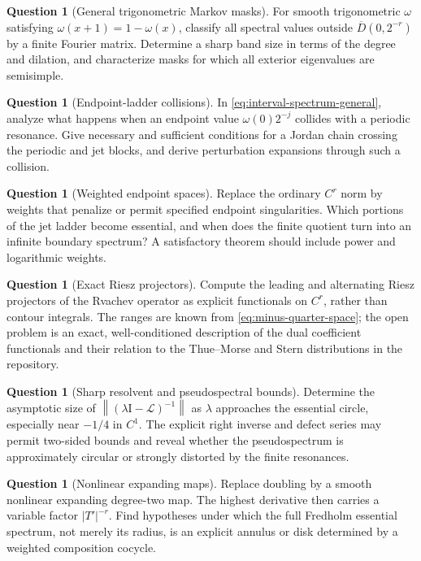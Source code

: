 \documentclass[11pt,a4paper]{article}
\theoremstyle{definition}
\newtheorem{question}[theorem]{Question}
\theoremstyle{remark}
\newcommand{\Dbar}[1]{\overline{D}(0,#1)}
\newcommand{\norm}[1]{\left\lVert #1\right\rVert}
\newcommand{\Lop}{\mathcal L}
\newcommand{\id}{\mathrm I}
\begin{document}
\begin{question}[General trigonometric Markov masks]
For smooth trigonometric $\omega$ satisfying
$\omega(x+1)=1-\omega(x)$, classify all spectral values outside
$\Dbar{2^{-r}}$ by a finite Fourier matrix.  Determine a sharp band size in
terms of the degree and dilation, and characterize masks for which all
exterior eigenvalues are semisimple.
\end{question}

\begin{question}[Endpoint-ladder collisions]
In \eqref{eq:interval-spectrum-general}, analyze what happens when an endpoint
value $\omega(0)2^{-j}$ collides with a periodic resonance.  Give necessary
and sufficient conditions for a Jordan chain crossing the periodic and jet
blocks, and derive perturbation expansions through such a collision.
\end{question}

\begin{question}[Weighted endpoint spaces]
Replace the ordinary $C^r$ norm by weights that penalize or permit specified
endpoint singularities.  Which portions of the jet ladder become essential,
and when does the finite quotient turn into an infinite boundary spectrum?
A satisfactory theorem should include power and logarithmic weights.
\end{question}

\begin{question}[Exact Riesz projectors]
Compute the leading and alternating Riesz projectors of the Rvachev operator
as explicit functionals on $C^r$, rather than contour integrals.  The ranges
are known from \eqref{eq:minus-quarter-space}; the open problem is an exact,
well-conditioned description of the dual coefficient functionals and their
relation to the Thue--Morse and Stern distributions in the repository.
\end{question}

\begin{question}[Sharp resolvent and pseudospectral bounds]
Determine the asymptotic size of
$\norm{(\lambda\id-\Lop)^{-1}}$ as $\lambda$ approaches the essential circle,
especially near $-1/4$ in $C^1$.  The explicit right inverse and defect
series may permit two-sided bounds and reveal whether the pseudospectrum is
approximately circular or strongly distorted by the finite resonances.
\end{question}

\begin{question}[Nonlinear expanding maps]
Replace doubling by a smooth nonlinear expanding degree-two map.  The highest
derivative then carries a variable factor $|T'|^{-r}$.  Find hypotheses under
which the full Fredholm essential spectrum, not merely its radius, is an
explicit annulus or disk determined by a weighted composition cocycle.
\end{question}
\end{document}
